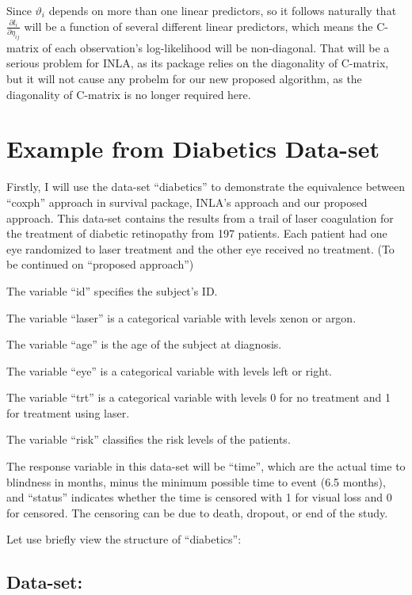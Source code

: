 \documentclass[]{article}
\begin{document}
Since \(\vartheta_i\) depends on more than one linear predictors, so it
follows naturally that \(\frac{\partial l_i}{\partial \eta_{ij}}\) will
be a function of several different linear predictors, which means the
C-matrix of each observation's log-likelihood will be non-diagonal. That
will be a serious problem for INLA, as its package relies on the
diagonality of C-matrix, but it will not cause any probelm for our new
proposed algorithm, as the diagonality of C-matrix is no longer required
here.

\hypertarget{example-from-diabetics-data-set}{%
\section{Example from Diabetics
Data-set}\label{example-from-diabetics-data-set}}

Firstly, I will use the data-set ``diabetics'' to demonstrate the
equivalence between ``coxph'' approach in survival package, INLA's
approach and our proposed approach. This data-set contains the results
from a trail of laser coagulation for the treatment of diabetic
retinopathy from 197 patients. Each patient had one eye randomized to
laser treatment and the other eye received no treatment. (To be
continued on ``proposed approach'')

The variable ``id'' specifies the subject's ID.

The variable ``laser'' is a categorical variable with levels xenon or
argon.

The variable ``age'' is the age of the subject at diagnosis.

The variable ``eye'' is a categorical variable with levels left or
right.

The variable ``trt'' is a categorical variable with levels 0 for no
treatment and 1 for treatment using laser.

The variable ``risk'' classifies the risk levels of the patients.

The response variable in this data-set will be ``time'', which are the
actual time to blindness in months, minus the minimum possible time to
event (6.5 months), and ``status'' indicates whether the time is
censored with 1 for visual loss and 0 for censored. The censoring can be
due to death, dropout, or end of the study.

Let use briefly view the structure of ``diabetics'':

\hypertarget{data-set}{%
\subsection{Data-set:}\label{data-set}}
\end{document}
